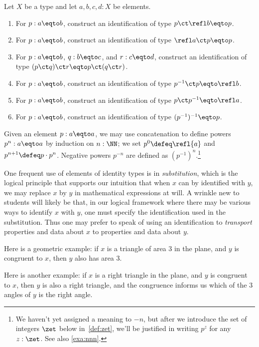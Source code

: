 \begin{xca}\label{xca:path-groupoid-laws}
  Let $X$ be a type and let $a,b,c,d:X$ be elements.
  \begin{enumerate}
    \item For $p:a \eqto b$, construct an identification of type $p \ct \refl b \eqto p$.
    \item For $p:a \eqto b$, construct an identification of type $\refl a \ct p \eqto p$.
    \item For $p:a \eqto b$, $q:b \eqto c$, and $r:c \eqto d$, construct an identification of type $(p \ct q) \ct r \eqto p \ct (q \ct r)$.
    \item For $p:a \eqto b$, construct an identification of type $p^{-1} \ct p \eqto \refl b$.
    \item For $p:a \eqto b$, construct an identification of type $p \ct p^{-1} \eqto \refl a$.
    \item For $p:a \eqto b$, construct an identification of type $(p^{-1})^{-1} \eqto p$.
    \qedhere
  \end{enumerate}
\end{xca}

Given an element $p:a \eqto a$, we may use concatenation to define powers $p^n : a \eqto a$ 
by induction on $n:\NN$; we set $p^0\defeq\refl{a}$ and
$p^{n+1}\defeq p\cdot p^n$. Negative powers $p^{-n}$ are defined
as $(p^{-1})^n$.\footnote{We haven't yet assigned a meaning to $-n$,
  but after we introduce the set of integers $\zet$ below in~\cref{def:zet},
  we'll be justified in writing $p^z$ for any $z:\zet$.  See also \cref{exa:nnn}.}

One frequent use of elements of identity types is in \emph{substitution}, which is
the logical principle that supports our intuition that when $x$ can by identified with $y$, we may replace $x$ by $y$
in mathematical expressions at will.  A wrinkle new to students will likely be that, in our logical framework
where there may be various ways to identify $x$ with $y$, one must specify the identification used in the substitution.
Thus one may prefer to speak of using an identification to \emph{transport} properties and data about $x$ to properties and data about $y$.

Here is a geometric example: if $x$ is a triangle of area $3$ in the plane, and $y$ is congruent to $x$, then $y$ also has area $3$.

Here is another example: if $x$ is a right triangle in the plane, and $y$ is congruent to $x$, then $y$ is also a right triangle, and
the congruence informs us which of the $3$ angles of $y$ is the right angle.


